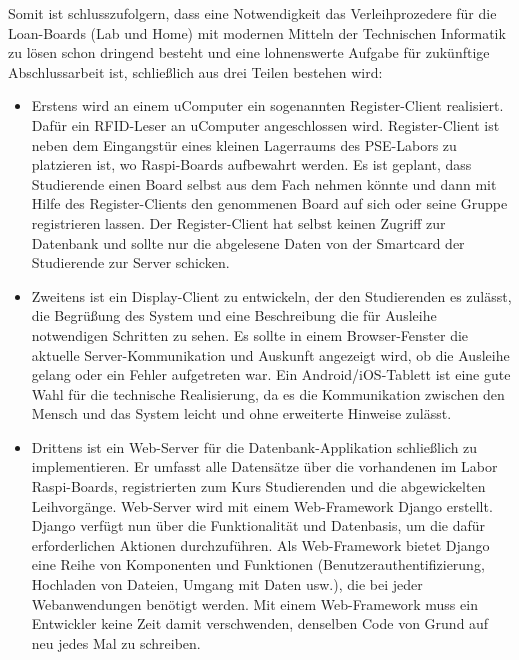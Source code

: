 Somit ist schlusszufolgern, dass eine Notwendigkeit das Verleihprozedere für die Loan-Boards (Lab und Home) mit modernen Mitteln der Technischen Informatik zu lösen schon dringend besteht und eine lohnenswerte Aufgabe für zukünftige Abschlussarbeit ist, schließlich aus drei Teilen bestehen wird:
\begin{itemize}
	\item Erstens wird an einem uComputer ein sogenannten Register-Client realisiert. Dafür ein RFID-Leser an uComputer angeschlossen wird. Register-Client ist neben dem Eingangstür eines kleinen Lagerraums des PSE-Labors zu platzieren ist, wo Raspi-Boards aufbewahrt werden. Es ist geplant, dass Studierende einen Board selbst aus dem Fach nehmen könnte und dann mit Hilfe des Register-Clients den genommenen Board auf sich oder seine Gruppe registrieren lassen. Der Register-Client hat selbst keinen Zugriff zur Datenbank und sollte nur die abgelesene Daten von der Smartcard der Studierende zur Server schicken. 
	\item Zweitens ist ein Display-Client zu entwickeln, der den Studierenden es zulässt, die Begrüßung des System und eine Beschreibung die für Ausleihe notwendigen Schritten zu sehen. Es sollte in einem Browser-Fenster die aktuelle Server-Kommunikation und Auskunft angezeigt wird, ob die Ausleihe gelang oder ein Fehler aufgetreten war. Ein Android/iOS-Tablett ist eine gute Wahl für die technische Realisierung, da es die Kommunikation zwischen den Mensch und das System leicht und ohne erweiterte Hinweise zulässt. 
	\item Drittens ist ein Web-Server für die Datenbank-Applikation schließlich zu implementieren. Er umfasst alle Datensätze über die vorhandenen im Labor Raspi-Boards, registrierten zum Kurs Studierenden und die abgewickelten Leihvorgänge.  Web-Server wird mit einem Web-Framework Django erstellt. Django verfügt nun über die Funktionalität und Datenbasis, um die dafür erforderlichen Aktionen durchzuführen. Als Web-Framework bietet Django eine Reihe von Komponenten und Funktionen (Benutzerauthentifizierung, Hochladen von Dateien, Umgang mit Daten usw.), die bei jeder Webanwendungen benötigt werden. Mit einem Web-Framework muss ein Entwickler keine Zeit damit verschwenden, denselben Code von Grund auf neu jedes Mal zu schreiben.
\end{itemize}

